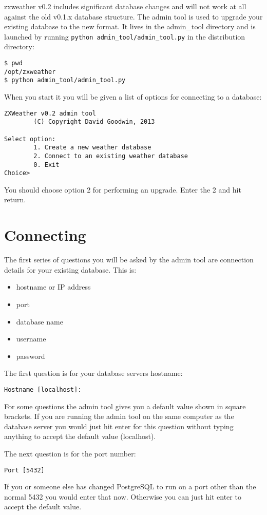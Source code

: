 \documentclass[a4paper,10pt,draft]{book}
\begin{document}
zxweather v0.2 includes significant database changes and will not work at all against the old v0.1.x database structure. The admin tool is used to upgrade your existing database to the new format. It lives in the admin\_tool directory and is launched by running \verb|python admin_tool/admin_tool.py| in the distribution directory:

\begin{verbatim}
$ pwd
/opt/zxweather
$ python admin_tool/admin_tool.py
\end{verbatim}

When you start it you will be given a list of options for connecting to a database:
\begin{verbatim}
ZXWeather v0.2 admin tool
        (C) Copyright David Goodwin, 2013

Select option:
        1. Create a new weather database
        2. Connect to an existing weather database
        0. Exit
Choice>
\end{verbatim}

You should choose option 2 for performing an upgrade. Enter the 2 and hit return.

\section{Connecting}
The first series of questions you will be asked by the admin tool are connection details for your existing database. This is:
\begin{itemize}
\item hostname or IP address
\item port
\item database name
\item username
\item password
\end{itemize}

The first question is for your database servers hostname:
\begin{verbatim}
Hostname [localhost]:
\end{verbatim}
For some questions the admin tool gives you a default value shown in square brackets. If you are running the admin tool on the same computer as the database server you would just hit enter for this question without typing anything to accept the default value (localhost).

The next question is for the port number:
\begin{verbatim}
Port [5432]
\end{verbatim}
If you or someone else has changed PostgreSQL to run on a port other than the normal 5432 you would enter that now. Otherwise you can just hit enter to accept the default value.
\end{document}
